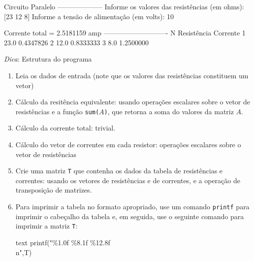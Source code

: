 \documentclass[11pt,fleqn]{practice}
\begin{document}
\begin{enumerate}
\begin{runexample}
Circuito Paralelo
--------------------
Informe os valores das resistências (em ohms):  [23 12 8]
Informe a tensão de alimentação (em volts): 10

Corrente total =  2.5181159  amp
----------------------------
N  Resistência       Corrente
1         23.0       0.4347826
2         12.0       0.8333333
3           8.0      1.2500000
\end{runexample}
        
\emph{Dica\/}: Estrutura do programa
\begin{enumerate}
   \item Leia os dados de entrada (note que os valores das resistências constituem um vetor)
   \item Cálculo da resitência equivalente: usando operações escalares sobre o vetor de resistências e a função \texttt{sum($A$)}, que retorna a soma do valores da matriz $A$.
   \item Cálculo da corrente total: trivial.
   \item Cálculo do vetor de correntes em cada resistor: operações escalares sobre o vetor de resistências
   \item Crie uma matriz \texttt{T} que contenha os dados da tabela de resistências e correntes: usando os vetores de resistências e de correntes, e a operação de transposição de matrizes.
  \item Para imprimir a tabela no formato apropriado, use um comando \texttt{printf} para imprimir o cabeçalho da tabela e, em seguida, use o seguinte comando para imprimir a matriz \texttt{T}: 
\begin{lst}{text}
	printf("\%1.0f \%8.1f \%12.8f\\n",T)
\end{lst} 
\end{enumerate}



\end{enumerate}
\end{document}
